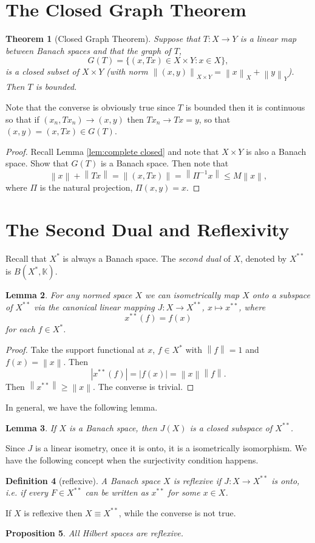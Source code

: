 \documentclass[12pt,a4paper]{report}
\numberwithin{equation}{section}
\theoremstyle{mystyle}
\newtheorem{definition}{Definition}[section]
\newtheorem{theorem}[definition]{Theorem}
\newtheorem{lemma}[definition]{Lemma}
\newtheorem{proposition}[definition]{Proposition}
\newcommand{\K}{\mathbb{K}}
\newcommand{\abs}[1]{\left\lvert #1 \right\rvert}
\newcommand{\norm}[1]{\left\lVert #1 \right\rVert}
\begin{document}
	
	\section{The Closed Graph Theorem}
	\begin{theorem}[Closed Graph Theorem]
		Suppose that $T:X\to Y$ is a linear map between Banach spaces and that the graph of $T$,
		$$
		G(T)=\{(x,Tx)\in X\times Y: x\in X\},
		$$
		is a closed subset of $X\times Y$ (with norm $\norm{(x,y)}_{X\times Y}=\norm{x}_X+\norm{y}_Y$). Then $T$ is bounded.
	\end{theorem}
	Note that the converse is obviously true since $T$ is bounded then it is continuous so that if $(x_n,Tx_n)\to (x,y)$ then $Tx_n\to Tx=y$, so that $(x,y)=(x,Tx)\in G(T)$.
	\begin{proof}
		Recall Lemma \ref{lem:complete closed} and note that $X\times Y$ is also a Banach space. Show that $G(T)$ is a Banach space. Then note that
		$$
		\norm{x}+\norm{Tx}=\norm{(x,Tx)}=\norm{\Pi^{-1}x}\leq M\norm{x},
		$$
		where $\Pi$ is the natural projection, $\Pi(x,y)=x$.
	\end{proof}
	
	\section{The Second Dual and Reflexivity}
	Recall that $X^*$ is always a Banach space. The \emph{second dual} of $X$, denoted by $X^{**}$ is $B(X^*,\K)$.
	\begin{lemma}
		For any normed space $X$ we can isometrically map $X$ onto a subspace of $X^{**}$ via the canonical linear mapping $J: X\to X^{**}$, $x\mapsto x^{**}$, where
		$$
		x^{**}(f)=f(x)
		$$
		for each $f\in X^*$.
	\end{lemma}
	\begin{proof}
		Take the support functional at $x$, $f\in X^*$ with $\norm{f}=1$ and $f(x)=\norm{x}$. Then 
		$$
		\abs{x^{**}(f)}=\abs{f(x)}=\norm{x}\norm{f}.
		$$
		Then $\norm{x^{**}}\geq \norm{x}$. The converse is trivial.
	\end{proof}
	
	In general, we have the following lemma.
	\begin{lemma}
		If $X$ is a Banach space, then $J(X)$ is a closed subspace of $X^{**}$.
	\end{lemma}
	
	Since $J$ is a linear isometry, once it is onto, it is a isometrically isomorphism. We have the following concept when the surjectivity condition happens.
	\begin{definition}[reflexive]
		A Banach space $X$ is reflexive if $J: X\to X^{**}$ is onto, i.e. if every $F\in X^{**}$ can be written as $x^{**}$ for some $x\in X$.
	\end{definition}
	If $X$ is reflexive then $X\equiv X^{**}$, while the converse is not true.
	\begin{proposition}
		All Hilbert spaces are reflexive.
	\end{proposition}
	
\end{document}
